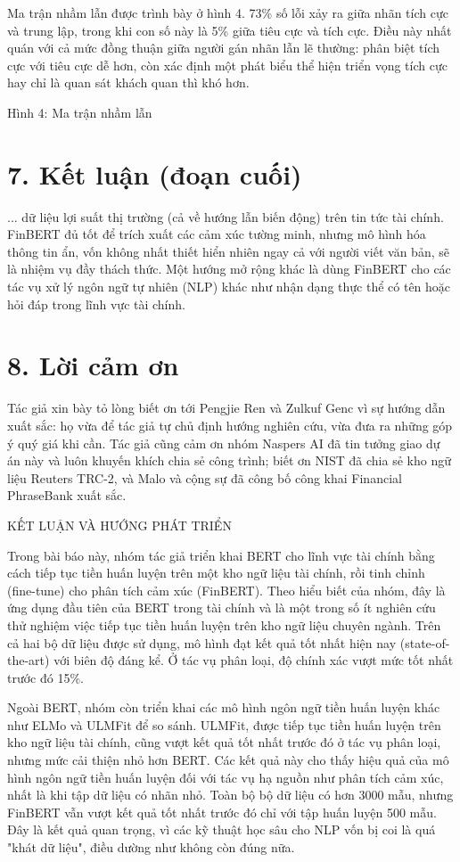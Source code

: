 Ma trận nhầm lẫn được trình bày ở hình 4. 73\% số lỗi xảy ra giữa nhãn tích cực và trung lập, trong khi con số này là 5\% giữa tiêu cực và tích cực. Điều này nhất quán với cả mức đồng thuận giữa người gán nhãn lẫn lẽ thường: phân biệt tích cực với tiêu cực dễ hơn, còn xác định một phát biểu thể hiện triển vọng tích cực hay chỉ là quan sát khách quan thì khó hơn.

Hình 4: Ma trận nhầm lẫn

\section{7. Kết luận (đoạn cuối)}

... dữ liệu lợi suất thị trường (cả về hướng lẫn biến động) trên tin tức tài chính. FinBERT đủ tốt để trích xuất các cảm xúc tường minh, nhưng mô hình hóa thông tin ẩn, vốn không nhất thiết hiển nhiên ngay cả với người viết văn bản, sẽ là nhiệm vụ đầy thách thức. Một hướng mở rộng khác là dùng FinBERT cho các tác vụ xử lý ngôn ngữ tự nhiên (NLP) khác như nhận dạng thực thể có tên hoặc hỏi đáp trong lĩnh vực tài chính.

\section{8. Lời cảm ơn}

Tác giả xin bày tỏ lòng biết ơn tới Pengjie Ren và Zulkuf Genc vì sự hướng dẫn xuất sắc: họ vừa để tác giả tự chủ định hướng nghiên cứu, vừa đưa ra những góp ý quý giá khi cần. Tác giả cũng cảm ơn nhóm Naspers AI đã tin tưởng giao dự án này và luôn khuyến khích chia sẻ công trình; biết ơn NIST đã chia sẻ kho ngữ liệu Reuters TRC-2, và Malo và cộng sự đã công bố công khai Financial PhraseBank xuất sắc.


KẾT LUẬN VÀ HƯỚNG PHÁT TRIỂN

Trong bài báo này, nhóm tác giả triển khai BERT cho lĩnh vực tài chính bằng cách tiếp tục tiền huấn luyện trên một kho ngữ liệu tài chính, rồi tinh chỉnh (fine-tune) cho phân tích cảm xúc (FinBERT). Theo hiểu biết của nhóm, đây là ứng dụng đầu tiên của BERT trong tài chính và là một trong số ít nghiên cứu thử nghiệm việc tiếp tục tiền huấn luyện trên kho ngữ liệu chuyên ngành. Trên cả hai bộ dữ liệu được sử dụng, mô hình đạt kết quả tốt nhất hiện nay (state-of-the-art) với biên độ đáng kể. Ở tác vụ phân loại, độ chính xác vượt mức tốt nhất trước đó 15\%.

Ngoài BERT, nhóm còn triển khai các mô hình ngôn ngữ tiền huấn luyện khác như ELMo và ULMFit để so sánh. ULMFit, được tiếp tục tiền huấn luyện trên kho ngữ liệu tài chính, cũng vượt kết quả tốt nhất trước đó ở tác vụ phân loại, nhưng mức cải thiện nhỏ hơn BERT. Các kết quả này cho thấy hiệu quả của mô hình ngôn ngữ tiền huấn luyện đối với tác vụ hạ nguồn như phân tích cảm xúc, nhất là khi tập dữ liệu có nhãn nhỏ. Toàn bộ bộ dữ liệu có hơn 3000 mẫu, nhưng FinBERT vẫn vượt kết quả tốt nhất trước đó chỉ với tập huấn luyện 500 mẫu. Đây là kết quả quan trọng, vì các kỹ thuật học sâu cho NLP vốn bị coi là quá "khát dữ liệu", điều dường như không còn đúng nữa.

